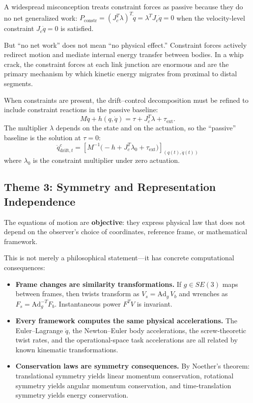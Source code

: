\documentclass[11pt]{article}
\begin{document}
A widespread misconception treats constraint forces as passive because they do no net generalized work: $P_{\mathrm{constr}} = (J_c^T \lambda)^T \dot{q} = \lambda^T J_c \dot{q} = 0$ when the velocity-level constraint $J_c \dot{q} = 0$ is satisfied.

But ``no net work'' does not mean ``no physical effect.''
Constraint forces actively redirect motion and mediate internal energy transfer between bodies.
In a whip crack, the constraint forces at each link junction are enormous and are the primary mechanism by which kinetic energy migrates from proximal to distal segments.

When constraints are present, the drift--control decomposition must be refined to include constraint reactions in the passive baseline:
\begin{equation}\label{eq:constrained-master}
M\ddot{q} + h(q,\dot{q}) = \tau + J_c^T\lambda + \tau_{\mathrm{ext}}.
\end{equation}
The multiplier $\lambda$ depends on the state and on the actuation, so the ``passive'' baseline is the solution at $\tau = 0$:
\begin{equation}
\ddot{q}_{\mathrm{drift},t}^{c} = \left[M^{-1}\bigl(-h + J_c^T\lambda_0 + \tau_{\mathrm{ext}}\bigr)\right]_{(q(t),\dot{q}(t))}
\end{equation}
where $\lambda_0$ is the constraint multiplier under zero actuation.


\subsection{Theme 3: Symmetry and Representation Independence}

The equations of motion are \textbf{objective}: they express physical law that does not depend on the observer's choice of coordinates, reference frame, or mathematical framework.

This is not merely a philosophical statement---it has concrete computational consequences:
\begin{itemize}
\item \textbf{Frame changes are similarity transformations.}
If $g \in SE(3)$ maps between frames, then twists transform as $V_s = \mathrm{Ad}_g\, V_b$ and wrenches as $F_s = \mathrm{Ad}_g^{-T} F_b$.
Instantaneous power $F^T V$ is invariant.

\item \textbf{Every framework computes the same physical accelerations.}
The Euler--Lagrange $\ddot{q}$, the Newton--Euler body accelerations, the screw-theoretic twist rates, and the operational-space task accelerations are all related by known kinematic transformations.

\item \textbf{Conservation laws are symmetry consequences.}
By Noether's theorem: translational symmetry yields linear momentum conservation, rotational symmetry yields angular momentum conservation, and time-translation symmetry yields energy conservation.
\end{itemize}
\end{document}
